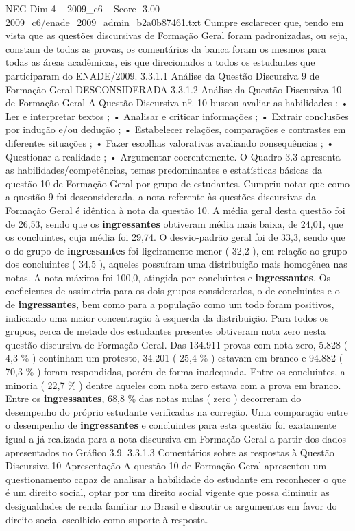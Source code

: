 \begin{textsample}{NEG Dim 4 – 2009\_c6 – Score -3.00 – 2009\_c6/enade\_2009\_admin\_b2a0b87461.txt}
Cumpre esclarecer que, tendo em vista que as questões discursivas de Formação Geral foram padronizadas, ou seja, constam de todas as provas, os comentários da banca foram os mesmos para todas as áreas acadêmicas, eis que direcionados a todos os estudantes que participaram do ENADE/2009. 3.3.1.1 Análise da Questão Discursiva 9 de Formação Geral DESCONSIDERADA 3.3.1.2 Análise da Questão Discursiva 10 de Formação Geral A Questão Discursiva nº. 10 buscou avaliar as habilidades : • Ler e interpretar textos ; • Analisar e criticar informações ; • Extrair conclusões por indução e/ou dedução ; • Estabelecer relações, comparações e contrastes em diferentes situações ; • Fazer escolhas valorativas avaliando consequências ; • Questionar a realidade ; • Argumentar coerentemente.
O Quadro 3.3 apresenta as habilidades/competências, temas predominantes e estatísticas básicas da questão 10 de Formação Geral por grupo de estudantes.
Cumpriu notar que como a questão 9 foi desconsiderada, a nota referente às questões discursivas da Formação Geral é idêntica à nota da questão 10.
A média geral desta questão foi de 26,53, sendo que os \textbf{ingressantes} obtiveram média mais baixa, de 24,01, que os concluintes, cuja média foi 29,74.
O desvio-padrão geral foi de 33,3, sendo que o do grupo de \textbf{ingressantes} foi ligeiramente menor ( 32,2 ), em relação ao grupo dos concluintes ( 34,5 ), aqueles possuíram uma distribuição mais homogênea nas notas.
A nota máxima foi 100,0, atingida por concluintes e \textbf{ingressantes}.
Os coeficientes de assimetria para os dois grupos considerados, o de concluintes e o de \textbf{ingressantes}, bem como para a população como um todo foram positivos, indicando uma maior concentração à esquerda da distribuição.
Para todos os grupos, cerca de metade dos estudantes presentes obtiveram nota zero nesta questão discursiva de Formação Geral.
Das 134.911 provas com nota zero, 5.828 ( 4,3 \% ) continham um protesto, 34.201 ( 25,4 \% ) estavam em branco e 94.882 ( 70,3 \% ) foram respondidas, porém de forma inadequada.
Entre os concluintes, a minoria ( 22,7 \% ) dentre aqueles com nota zero estava com a prova em branco.
Entre os \textbf{ingressantes}, 68,8 \% das notas nulas ( zero ) decorreram do desempenho do próprio estudante verificadas na correção.
Uma comparação entre o desempenho de \textbf{ingressantes} e concluintes para esta questão foi exatamente igual a já realizada para a nota discursiva em Formação Geral a partir dos dados apresentados no Gráfico 3.9. 3.3.1.3 Comentários sobre as respostas à Questão Discursiva 10 Apresentação A questão 10 de Formação Geral apresentou um questionamento capaz de analisar a habilidade do estudante em reconhecer o que é um direito social, optar por um direito social vigente que possa diminuir as desigualdades de renda familiar no Brasil e discutir os argumentos em favor do direito social escolhido como suporte à resposta.

\end{textsample}
